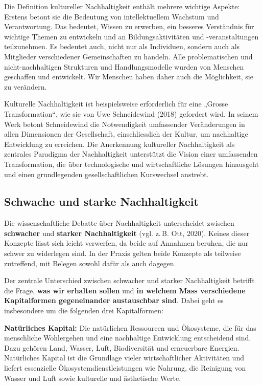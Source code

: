 \documentclass[
  letterpaper,
  DIV=11,
  numbers=noendperiod]{scrartcl}
\begin{document}
Die Definition kultureller Nachhaltigkeit enthält mehrere wichtige
Aspekte: Erstens betont sie die Bedeutung von intellektuellem Wachstum
und Verantwortung. Das bedeutet, Wissen zu erwerben, ein besseres
Verständnis für wichtige Themen zu entwickeln und an Bildungsaktivitäten
und -veranstaltungen teilzunehmen. Es bedeutet auch, nicht nur als
Individuen, sondern auch als Mitglieder verschiedener Gemeinschaften zu
handeln. Alle problematischen und nicht-nachhaltigen Strukturen und
Handlungsmodelle wurden von Menschen geschaffen und entwickelt. Wir
Menschen haben daher auch die Möglichkeit, sie zu verändern.

Kulturelle Nachhaltigkeit ist beispielsweise erforderlich für eine
„Grosse Transformation``, wie sie von Uwe Schneidewind (2018) gefordert
wird. In seinem Werk betont Schneidewind die Notwendigkeit umfassender
Veränderungen in allen Dimensionen der Gesellschaft, einschliesslich der
Kultur, um nachhaltige Entwicklung zu erreichen. Die Anerkennung
kultureller Nachhaltigkeit als zentrales Paradigma der Nachhaltigkeit
unterstützt die Vision einer umfassenden Transformation, die über
technologische und wirtschaftliche Lösungen hinausgeht und einen
grundlegenden gesellschaftlichen Kurswechsel anstrebt.

\subsection{Schwache und starke
Nachhaltigkeit}\label{schwache-und-starke-nachhaltigkeit}

Die wissenschaftliche Debatte über Nachhaltigkeit unterscheidet zwischen
\textbf{schwacher} und \textbf{starker Nachhaltigkeit} (vgl. z.\,B. Ott,
2020). Keines dieser Konzepte lässt sich leicht verwerfen, da beide auf
Annahmen beruhen, die nur schwer zu widerlegen sind. In der Praxis
gelten beide Konzepte als teilweise zutreffend, mit Belegen sowohl dafür
als auch dagegen.

Der zentrale Unterschied zwischen schwacher und starker Nachhaltigkeit
betrifft die Frage, \textbf{was wir erhalten sollen} und \textbf{in
welchem Mass verschiedene Kapitalformen gegeneinander austauschbar
sind}. Dabei geht es insbesondere um die folgenden drei Kapitalformen:

\textbf{Natürliches Kapital:} Die natürlichen Ressourcen und Ökosysteme,
die für das menschliche Wohlergehen und eine nachhaltige Entwicklung
entscheidend sind. Dazu gehören Land, Wasser, Luft, Biodiversität und
erneuerbare Energien. Natürliches Kapital ist die Grundlage vieler
wirtschaftlicher Aktivitäten und liefert essenzielle
Ökosystemdienstleistungen wie Nahrung, die Reinigung von Wasser und Luft
sowie kulturelle und ästhetische Werte.
\end{document}
